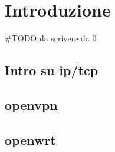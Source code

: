
\chapter{Introduzione}


\#TODO da scrivere da 0 

\section{Intro su ip/tcp} 
\label{Scopo_e_analisi_del_progetto}


\section{openvpn}
\label{caratteristiche_vps}


\section{openwrt}
\label{caratteristiche_gateway}

